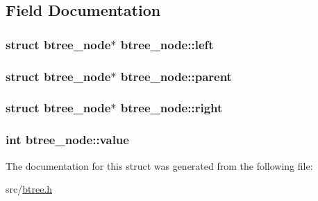 \subsection{Field Documentation}
\hypertarget{structbtree__node_a55f358b03c38061a2786959d2a12f3c0}{
\subsubsection[{left}]{\setlength{\rightskip}{0pt plus 5cm}struct {\bf btree\-\_\-node}$\ast$ btree\-\_\-node\-::left}}\label{structbtree__node_a55f358b03c38061a2786959d2a12f3c0}
\hypertarget{structbtree__node_a25d210269828a729ec00d451914a1d2a}{
\subsubsection[{parent}]{\setlength{\rightskip}{0pt plus 5cm}struct {\bf btree\-\_\-node}$\ast$ btree\-\_\-node\-::parent}}\label{structbtree__node_a25d210269828a729ec00d451914a1d2a}
\hypertarget{structbtree__node_a4cb67aac590e5126f3e0c030fc5c3d02}{
\subsubsection[{right}]{\setlength{\rightskip}{0pt plus 5cm}struct {\bf btree\-\_\-node}$\ast$ btree\-\_\-node\-::right}}\label{structbtree__node_a4cb67aac590e5126f3e0c030fc5c3d02}
\hypertarget{structbtree__node_a92f1076bdc6de97897d7071c8262d415}{
\subsubsection[{value}]{\setlength{\rightskip}{0pt plus 5cm}int btree\-\_\-node\-::value}}\label{structbtree__node_a92f1076bdc6de97897d7071c8262d415}


The documentation for this struct was generated from the following file\-:\begin{DoxyCompactItemize}
\item 
src/\hyperlink{btree_8h}{btree.\-h}\end{DoxyCompactItemize}
